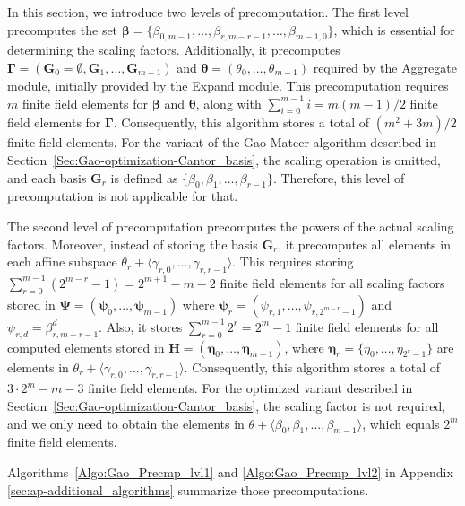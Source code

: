 In this section, we introduce two levels of precomputation. The first level precomputes the set $\boldsymbol{\beta} = \{\beta_{0, m-1}, \ldots, \beta_{r, m-r-1}, \ldots, \beta_{m-1, 0} \}$, which is essential for determining the scaling factors. Additionally, it precomputes  $\boldsymbol{\Gamma} = (\mathbf{G}_0 = \emptyset, \mathbf{G}_1,  \ldots, \mathbf{G}_{m-1})$ and $\boldsymbol{\theta} = (\theta_0, \ldots, \theta_{m-1})$ required by the \textsf{Aggregate} module, initially provided by the \textsf{Expand} module. This precomputation requires $m$ finite field elements for $\boldsymbol{\beta}$ and $\boldsymbol{\theta}$, along with $\sum_{i=0}^{m-1} i = m(m-1)/2$ finite field elements for $\boldsymbol{\Gamma}$. Consequently, this algorithm stores a total of $(m^2+3m)/2$  finite field elements. 
For the  variant of the Gao-Mateer algorithm described in Section~\ref{Sec:Gao-optimization-Cantor_basis}, the scaling operation is omitted, and each basis $\mathbf{G}_r$ is defined as $\{\beta_0, \beta_1, \ldots, \beta_{r-1}\}$. Therefore, this level of precomputation is not applicable for that.

The second level of precomputation precomputes the powers of the actual scaling factors. Moreover, instead of storing the basis $\mathbf{G}_r$, it precomputes all elements in each affine subspace $\theta_r + \langle \gamma_{r,0}, \ldots, \gamma_{r,r-1} \rangle$. This requires storing $\sum_{r=0}^{m-1} (2^{m-r} - 1) = 2^{m+1} - m - 2$ finite field elements for all scaling factors stored in $\boldsymbol{\Psi} = (\boldsymbol{\psi}_0, \ldots, \boldsymbol{\psi}_{m-1})$ where $\boldsymbol{\psi}_r = (\psi_{r,1}, \ldots,   \psi_{r,2^{m-r}-1})$ and $\psi_{r,d} = \beta_{r, m-r-1}^d$. 
Also, it stores $\sum_{r=0}^{m-1} 2^r = 2^m - 1$ finite field elements for all computed elements stored in $\mathbf{H} = (\boldsymbol{\eta}_0, \ldots, \boldsymbol{\eta}_{m-1})$, where $\boldsymbol{\eta}_r = \{\eta_0, \ldots, \eta_{2^r-1}\}$ are elements in $\theta_r + \langle \gamma_{r,0}, \ldots, \gamma_{r,r-1} \rangle$. Consequently, this algorithm stores a total of $3 \cdot 2^m - m - 3$ finite field elements. For the optimized variant described in Section~\ref{Sec:Gao-optimization-Cantor_basis}, the scaling factor is not required, and we only need to obtain the elements in $\theta + \langle\beta_0, \beta_1, \ldots, \beta_{m-1}\rangle$, which equals $2^m$ finite field elements.

Algorithms~\ref{Algo:Gao_Precmp_lvl1} and \ref{Algo:Gao_Precmp_lvl2} in Appendix \ref{sec:ap-additional_algorithms} summarize those precomputations.



